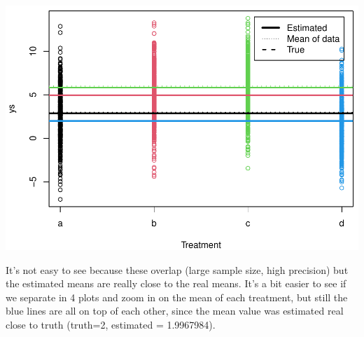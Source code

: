 \documentclass[
]{book}
\begin{document}
\includegraphics{ECOMODbook_files/figure-latex/a8.32-1.pdf}

It's not easy to see because these overlap (large sample size, high precision) but the estimated means are really close to the real means. It's a bit easier to see if we separate in 4 plots and zoom in on the mean of each treatment, but still the blue lines are all on top of each other, since the mean value was estimated real close to truth (truth=2, estimated = 1.9967984).
\end{document}
